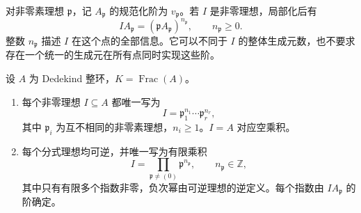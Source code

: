对非零素理想 \(\mathfrak p\)，记 \(A_{\mathfrak p}\) 的规范化阶为 \(v_{\mathfrak p}\)。若 \(I\) 是非零理想，局部化后有
\[
	I A_{\mathfrak p}
	=(\mathfrak pA_{\mathfrak p})^{n_{\mathfrak p}},
	\qquad n_{\mathfrak p}\geq0.
\]
整数 \(n_{\mathfrak p}\) 描述 \(I\) 在这个点的全部信息。它可以不同于 \(I\) 的整体生成元数，也不要求存在一个统一的生成元在所有点同时实现这些阶。

\begin{theorem}
\label{g5:thm:dedekind-factorization}
	设 \(A\) 为 Dedekind 整环，\(K=\operatorname{Frac}(A)\)。
	\begin{enumerate}
		\item 每个非零理想 \(I\subseteq A\) 都唯一写为
		\[
			I=\mathfrak p_1^{n_1}\cdots\mathfrak p_r^{n_r},
		\]
		其中 \(\mathfrak p_i\) 为互不相同的非零素理想，\(n_i\geq1\)。\(I=A\) 对应空乘积。
		\item 每个分式理想均可逆，并唯一写为有限乘积
		\[
			I=\prod_{\mathfrak p\ne(0)}\mathfrak p^{n_{\mathfrak p}},
			\qquad n_{\mathfrak p}\in\mathbb Z,
		\]
		其中只有有限多个指数非零，负次幂由可逆理想的逆定义。每个指数由 \(IA_{\mathfrak p}\) 的阶确定。
	\end{enumerate}
\end{theorem}
